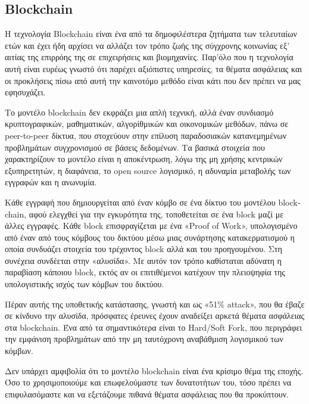 \subsection{ \textlatin{Blockchain}}

Η τεχνολογία \textlatin{Blockchain} είναι ένα από τα δημοφιλέστερα ζητήματα των τελευταίων ετών και έχει ήδη αρχίσει να αλλάζει τον τρόπο ζωής της σύγχρονης κοινωνίας εξ' αιτίας της επιρρόης της σε επιχειρήσεις και βιομηχανίες. Παρ'όλο που η τεχνολογία αυτή είναι ευρέως γνωστό ότι παρέχει αξιόπιστες υπηρεσίες, τα θέματα ασφάλειας και οι προκλήσεις πίσω από αυτή την καινοτόμο μεθόδο είναι κάτι που δεν πρέπει να μας εφησυχάζει.

Το μοντέλο \textlatin{blockchain} δεν εκφράζει μια απλή τεχνική, αλλά έναν συνδιασμό κρυπτογραφικών, μαθηματικών, αλγορίθμικών και οικονομικών μεθόδων, πάνω σε \textlatin{peer-to-peer} δίκτυα, που στοχεύουν στην επίλυση παραδοσιακών κατανεμημένων προβλημάτων συγχρονισμού σε βάσεις δεδομένων. Τα βασικά στοιχεία που χαρακτηρίζουν το μοντέλο είναι η αποκέντρωση, λόγω της μη χρήσης  κεντρικών εξυπηρετητών, η διαφάνεια, το \textlatin{open source} λογισμικό, η αδυναμία μεταβολής των εγγραφών και η ανωνυμία.

Κάθε εγγραφή που δημιουργείται από έναν κόμβο σε ένα δίκτυο του μοντέλου \textlatin{blockchain}, αφού ελεγχθεί για την εγκυρότητα της, τοποθετείται σε ένα \textlatin{block} μαζί με άλλες εγγραφές. Κάθε \textlatin{block} επισφραγίζεται με ένα «\textlatin{Proof of Work}», υπολογισμένο από έναν από τους κόμβους του δικτύου μέσω μιας συνάρτησης κατακερματισμού η οποία συνδυάζει στοιχεία του τρέχοντος \textlatin{block} αλλά και του προηγουμένου. Στη συνέχεια συνδέεται στην «αλυσίδα». Με αυτόν τον τρόπο καθίσταται αδύνατη η παραβίαση κάποιου \textlatin{block}, εκτός αν οι επιτιθέμενοι κατέχουν την πλειοψηφία της υπολογιστικής ισχύς των κόμβων του δικτύου.

Πέραν αυτής της υποθετικής κατάστασης, γνωστή και ως «51\% \textlatin{attack}», που θα έβαζε σε κίνδυνο την αλυσίδα\textlatin{\cite{bastiaan2015preventing}}, πρόσφατες έρευνες έχουν αναδείξει αρκετά θέματα ασφάλειας στα \textlatin{blockchain}. Ένα από τα σημαντικότερα είναι το \textlatin{Hard/Soft Fork}, που περιγράφει την  εμφάνιση προβλημάτων από την μη ταυτόχρονη αναβάθμιση λογισμικού των κόμβων.

Δεν υπάρχει αμφιβολία ότι το μοντέλο \textlatin{blockchain} είναι ένα κρίσιμο θέμα της εποχής. Όσο το χρησιμοποιούμε και επωφελούμαστε των δυνατοτήτων του, τόσο πρέπει να επιφυλασόμαστε και να εξετάζουμε πιθανά θέματα ασφάλειας που θα προκύπτουν.


